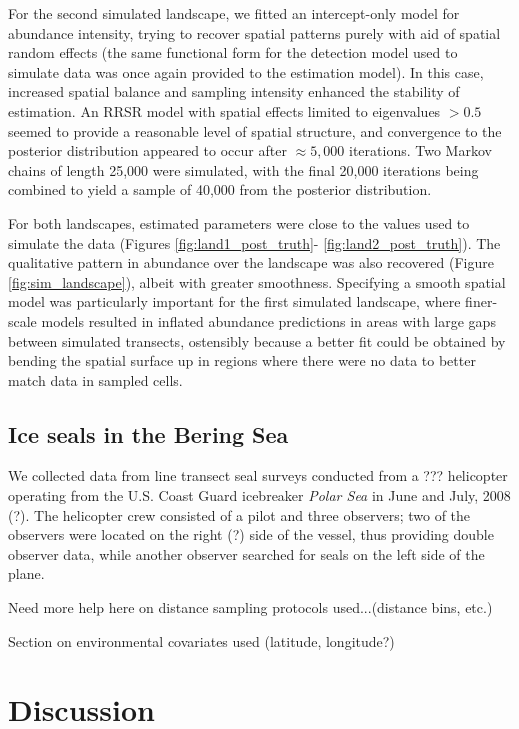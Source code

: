 \documentclass[10pt]{article}
\begin{document}
For the second simulated landscape, we fitted an intercept-only model for abundance intensity, trying to recover spatial patterns purely with aid of spatial random effects (the same functional form for the detection model used to simulate data was once again provided to the estimation model).  In this case, increased spatial balance and sampling intensity enhanced the stability of estimation.  An RRSR model with spatial effects limited to eigenvalues $> 0.5$ seemed to provide a reasonable level of spatial structure, and convergence to the posterior distribution appeared to occur after $\approx 5,000$ iterations.  Two Markov chains of length 25,000 were simulated, with the final 20,000 iterations being combined to yield a sample of 40,000 from the posterior distribution.

For both landscapes, estimated parameters were close to the values used to simulate the data (Figures \ref{fig:land1_post_truth}- \ref{fig:land2_post_truth}).  The qualitative pattern in abundance over the landscape was also recovered (Figure \ref{fig:sim_landscape}), albeit with greater smoothness.  Specifying a smooth spatial model was particularly important for the first simulated landscape, where finer-scale models resulted in inflated abundance predictions in areas with large gaps between simulated transects, ostensibly because a better fit could be obtained by bending the spatial surface up in regions where there were no data to better match data in sampled cells.


\subsection*{Ice seals in the Bering Sea}

We collected data from line transect seal surveys conducted from a ??? helicopter operating from the U.S. Coast Guard icebreaker {\it Polar Sea} in June and July, 2008 (?).  The helicopter crew consisted of a pilot and three observers; two of the observers were located on the right (?) side of the vessel, thus providing double observer data, while another observer searched for seals on the left side of the plane.

Need more help here on distance sampling protocols used...(distance bins, etc.)

Section on environmental covariates used (latitude, longitude?)


\section*{Discussion}
\end{document}
